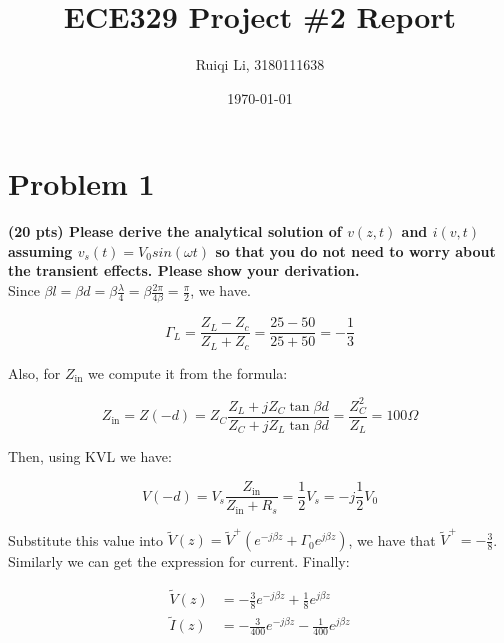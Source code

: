 \documentclass{article}
\title{\textbf{ECE329 Project \#2 Report}}
\author{Ruiqi Li, 3180111638}
\date{\today}
\begin{document}
\renewcommand{\algorithmicrequire}{\textbf{Input:}}  %
\renewcommand{\algorithmicensure}{\textbf{Output:}} %
\newcommand{\algorithmautorefname}{Algorithm} %

\maketitle

\section{Problem 1}

    \textbf{(20 pts) Please derive the analytical solution of $v(z, t)$ and $i(v, t)$ assuming $v_s(t) = V_0 sin(\omega t)$ so that you do not need to worry about the transient effects. Please show your derivation. } \\

    Since $\beta l = \beta d = \beta \frac{\lambda}{4} = \beta \frac{2\pi}{4\beta} = \frac{\pi}{2}$, we have.

    \begin{equation}
        \Gamma_L = \frac{Z_L - Z_c}{Z_L + Z_c} = \frac{25 - 50}{25 + 50} = -\frac{1}{3}
    \end{equation}

    Also, for $Z_{\text{in}}$ we compute it from the formula:

    \begin{equation}
        Z_{\text{in}} = Z(-d) = Z_C \frac{Z_L + jZ_C \tan{\beta d}}{Z_C + jZ_L \tan{\beta d}} = \frac{Z_C^2}{Z_L} = 100 \Omega
    \end{equation}

    Then, using KVL we have:

    \begin{equation}
        V(-d) = V_s \frac{Z_{\text{in}}}{Z_{\text{in}} + R_s} = \frac{1}{2}V_s = -j\frac{1}{2}V_0
    \end{equation}

    Substitute this value into $\tilde{V}(z) = \tilde{V}^+(e^{-j\beta z} + \Gamma_0 e^{j\beta z})$, we have that $\tilde{V}^+ = -\frac{3}{8}$. Similarly we can get the expression for current. Finally:

    \begin{align}
        \tilde{V}(z) &= -\frac{3}{8}e^{-j\beta z} + \frac{1}{8}e^{j\beta z} \nonumber \\
        \tilde{I}(z) &= -\frac{3}{400}e^{-j\beta z} - \frac{1}{400}e^{j\beta z} \nonumber
    \end{align}
\end{document}
